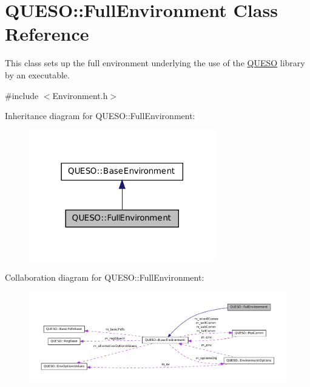 \hypertarget{class_q_u_e_s_o_1_1_full_environment}{\section{Q\-U\-E\-S\-O\-:\-:Full\-Environment Class Reference}
\label{class_q_u_e_s_o_1_1_full_environment}
}


This class sets up the full environment underlying the use of the \hyperlink{namespace_q_u_e_s_o}{Q\-U\-E\-S\-O} library by an executable.  




{\ttfamily \#include $<$Environment.\-h$>$}



Inheritance diagram for Q\-U\-E\-S\-O\-:\-:Full\-Environment\-:
\nopagebreak
\begin{figure}[H]
\begin{center}
\leavevmode
\includegraphics[width=230pt]{class_q_u_e_s_o_1_1_full_environment__inherit__graph}
\end{center}
\end{figure}


Collaboration diagram for Q\-U\-E\-S\-O\-:\-:Full\-Environment\-:
\nopagebreak
\begin{figure}[H]
\begin{center}
\leavevmode
\includegraphics[width=350pt]{class_q_u_e_s_o_1_1_full_environment__coll__graph}
\end{center}
\end{figure}
